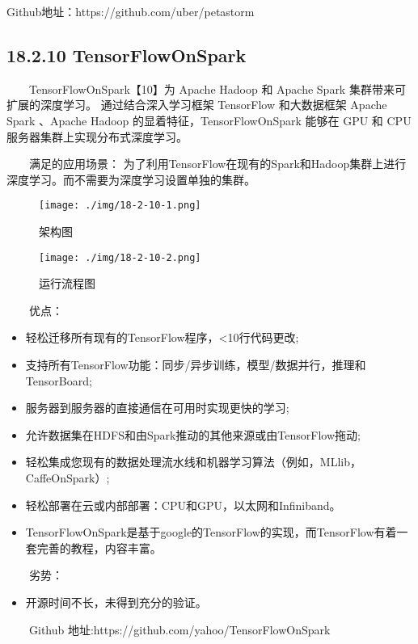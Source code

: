 Github地址：https://github.com/uber/petastorm

\subsection{18.2.10 TensorFlowOnSpark}\label{tensorflowonspark}

  TensorFlowOnSpark【10】为 Apache Hadoop 和 Apache Spark
集群带来可扩展的深度学习。 通过结合深入学习框架 TensorFlow 和大数据框架
Apache Spark 、Apache Hadoop 的显着特征，TensorFlowOnSpark 能够在 GPU 和
CPU 服务器集群上实现分布式深度学习。

  满足的应用场景：
为了利用TensorFlow在现有的Spark和Hadoop集群上进行深度学习。而不需要为深度学习设置单独的集群。

\begin{figure}
\centering
\texttt{[image: ./img/18-2-10-1.png]}
\caption{架构图}
\end{figure}

\begin{figure}
\centering
\texttt{[image: ./img/18-2-10-2.png]}
\caption{运行流程图}
\end{figure}

  优点：

\begin{itemize}
\item
  轻松迁移所有现有的TensorFlow程序，\textless{}10行代码更改;
\item
  支持所有TensorFlow功能：同步/异步训练，模型/数据并行，推理和TensorBoard;
\item
  服务器到服务器的直接通信在可用时实现更快的学习;
\item
  允许数据集在HDFS和由Spark推动的其他来源或由TensorFlow拖动;
\item
  轻松集成您现有的数据处理流水线和机器学习算法（例如，MLlib，CaffeOnSpark）;
\item
  轻松部署在云或内部部署：CPU和GPU，以太网和Infiniband。
\item
  TensorFlowOnSpark是基于google的TensorFlow的实现，而TensorFlow有着一套完善的教程，内容丰富。
\end{itemize}

  劣势：

\begin{itemize}
\item
  开源时间不长，未得到充分的验证。
\end{itemize}

  Github 地址:https://github.com/yahoo/TensorFlowOnSpark

